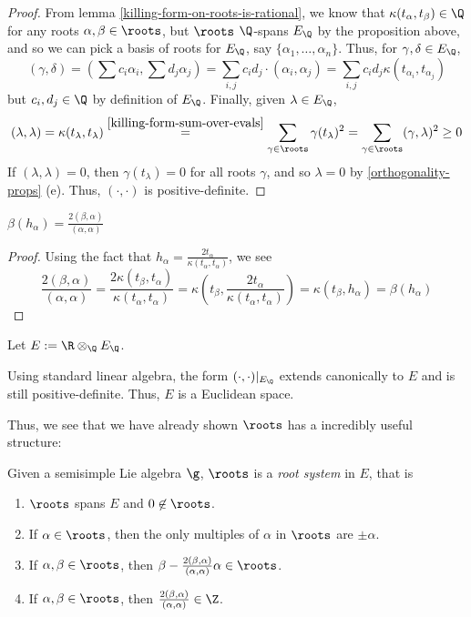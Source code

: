 \documentclass[11pt,leqno,oneside]{amsart}
\numberwithin{thm}{section}
\begin{document}
\begin{proof}
  From lemma \ref{killing-form-on-roots-is-rational}, we know that
  \(\kappa(t_\alpha, t_\beta) \in \Q\) 
  for any 
  roots \(\alpha,\beta \in \roots\), but \(\roots\) \(\Q\)-spans \(E_\Q\) by
  the proposition above,
  and so we can pick a basis of roots for \(E_\Q\), say \(\{\alpha_1,
  \ldots, \alpha_n\}\). Thus, for \(\gamma, \delta \in E_\Q\), \[
    (\gamma, \delta) = \left( \sum c_i \alpha_i, \sum d_j \alpha_j
    \right) = \sum_{i,j} c_i d_j \cdot (\alpha_i, \alpha_j) = \sum_{i,j} c_i
    d_j \kappa(t_{\alpha_i},t_{\alpha_j})
  \]
  but \(c_i,d_j \in \Q\) by definition of \(E_\Q\). Finally, given
  \(\lambda \in E_\Q\), \[
    (\lambda, \lambda) = \kappa(t_\lambda, t_\lambda)
    \overset{\ref{killing-form-sum-over-evals}}{=} \sum_{\gamma \in
      \roots} \gamma(t_\lambda)^2 
    = \sum_{\gamma \in \roots} (\gamma, \lambda)^2 \geq 0
  \]
  If \((\lambda,\lambda) = 0\), then \(\gamma(t_\lambda) = 0\) for all
  roots \(\gamma\), and so \(\lambda = 0\) by
  \ref{orthogonality-props} (e).
  Thus, \((\cdot, \cdot)\) is positive-definite.
\end{proof}
\begin{lem}\label{eval-is-root-sys-refln}
  \(\beta(h_\alpha) = \frac{2(\beta,\alpha)}{(\alpha,\alpha)}\)
\end{lem}
\begin{proof}
  Using the fact that \(h_\alpha =
  \frac{2t_\alpha}{\kappa(t_\alpha,t_\alpha)}\), we see \[
    \frac{2(\beta,\alpha)}{(\alpha,\alpha)} =
    \frac{2\kappa(t_\beta,t_\alpha)}{\kappa(t_\alpha,t_\alpha)} =
    \kappa\left( t_\beta, \frac{2t_\alpha}{\kappa(t_\alpha,t_\alpha)}
    \right) = \kappa(t_\beta, h_\alpha) = \beta(h_\alpha)
  \]
\end{proof}
\begin{defn}
  Let \(E := \R \otimes_\Q E_\Q\).
\end{defn}
\begin{rmk}
  Using standard linear algebra, the form \((\cdot,\cdot)|_{E_\Q}\)
  extends canonically to \(E\) and is still positive-definite. Thus,
  \(E\) is a Euclidean space.
\end{rmk}
Thus, we see that we have already shown \(\roots\) has a incredibly
useful structure:
\begin{prop}\label{roots-form-root-system}
  Given a semisimple Lie algebra \(\g\), \(\roots\) is a \emph{root
    system} in \(E\), that is
  \begin{enumerate}
  \item \(\roots\) spans \(E\) and \(0 \not \in \roots\).
  \item If \(\alpha \in \roots\), then the only multiples of
    \(\alpha\) in \(\roots\) are \(\pm \alpha\).
  \item If \(\alpha, \beta \in \roots\), then \(\beta -
    \frac{2(\beta,\alpha)}{(\alpha,\alpha)} \alpha \in \roots\).
  \item If \(\alpha, \beta \in \roots\), then
    \(\frac{2(\beta,\alpha)}{(\alpha, \alpha)} \in \Z\).
  \end{enumerate}
\end{prop}
\end{document}
